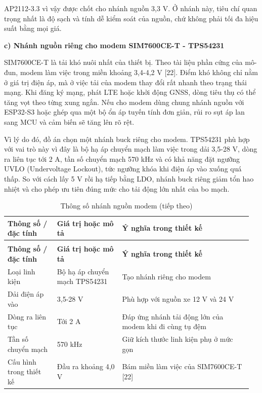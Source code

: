 \documentclass[a4paper]{extarticle}
\newcommand{\thesissettableid}[2]{%
  \renewcommand{\thetable}{#1}%
  \renewcommand{\theHtable}{#2}%
}
\begin{document}
AP2112-3.3 vì vậy được chốt cho nhánh nguồn 3,3 V. Ở nhánh này, tiêu chí quan
trọng nhất là độ sạch và tính dễ kiểm soát của nguồn, chứ không phải tối
đa hiệu suất bằng mọi giá.

\textbf{c) Nhánh nguồn riêng cho modem SIM7600CE-T - TPS54231}

SIM7600CE-T là tải khó nuôi nhất của thiết bị. Theo tài liệu phần cứng của
mô-đun, modem làm việc trong miền khoảng 3,4-4,2 V {[}22{]}. Điểm khó không chỉ
nằm ở giá trị điện áp, mà ở việc tải của modem thay đổi rất nhanh theo trạng
thái mạng. Khi đăng ký mạng, phát LTE hoặc khởi động GNSS, dòng tiêu thụ có
thể tăng vọt theo từng xung ngắn. Nếu cho modem dùng chung nhánh nguồn với ESP32-S3
hoặc ghép qua một bộ ổn áp tuyến tính đơn giản, rủi ro sụt áp lan sang MCU
và cảm biến sẽ tăng lên rõ rệt.

Vì lý do đó, đồ án chọn một nhánh buck riêng cho modem. TPS54231 phù hợp với
vai trò này vì đây là bộ hạ áp chuyển mạch làm việc trong dải 3,5-28 V, dòng
ra liên tục tới 2 A, tần số chuyển mạch 570 kHz và có khả năng đặt ngưỡng
UVLO (Undervoltage Lockout), tức ngưỡng khóa khi điện áp vào xuống quá thấp.
So với cách lấy 5 V rồi hạ tiếp bằng LDO, nhánh buck riêng giảm tổn hao nhiệt
và cho phép ưu tiên đúng mức cho tải động lớn nhất của bo mạch.

{\thesissettableid{3.12C}{condensed-bang-3-12c-thong-so-nhanh-nguon-modem}
\def\LTcaptype{table}
\begin{longtable}{|L{0.199\linewidth}|L{0.251\linewidth}|L{0.509\linewidth}|}
\caption{Thông số nhánh nguồn modem}\label{tab:condensed-bang-3-12c-thong-so-nhanh-nguon-modem}\\
\hline
\textbf{Thông số / đặc tính} & \textbf{Giá trị hoặc mô tả} & \textbf{Ý nghĩa trong thiết kế} \\
\hline
\endfirsthead
\caption[]{Thông số nhánh nguồn modem (tiếp theo)}\\
\hline
\textbf{Thông số / đặc tính} & \textbf{Giá trị hoặc mô tả} & \textbf{Ý nghĩa trong thiết kế} \\
\hline
\endhead
\endfoot
\endlastfoot
Loại linh kiện & Bộ hạ áp chuyển mạch TPS54231 & Tạo nhánh riêng cho modem \\\hline
Dải điện áp vào & 3,5-28 V & Phù hợp với nguồn xe 12 V và 24 V \\\hline
Dòng ra liên tục & Tới 2 A & Đáp ứng nhánh tải động lớn của modem khi đi cùng tụ đệm \\\hline
Tần số chuyển mạch & 570 kHz & Giữ kích thước linh kiện phụ ở mức gọn \\\hline
Cấu hình trong thiết kế & Đầu ra khoảng 4,0 V & Bám miền làm việc của SIM7600CE-T {[}22{]} \\\hline
\end{longtable}
}
\end{document}
